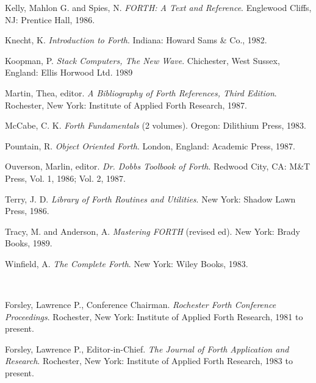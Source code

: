 \begin{description}
\begin{description}
	\item Kelly, Mahlon G. and Spies, N.
		\emph{FORTH: A Text and Reference}.
		Englewood Cliffs, NJ: Prentice Hall, 1986.

	\item Knecht, K.
		\emph{Introduction to Forth}.
		Indiana: Howard Sams \& Co., 1982.

	\item Koopman, P.
		\emph{Stack Computers, The New Wave}.
		Chichester, West Sussex, England: Ellis Horwood Ltd. 1989

	\item Martin, Thea, editor.
		\emph{A Bibliography of Forth References, Third Edition}.
		Rochester, New York: Institute of Applied Forth Research, 1987.

	\item McCabe, C. K.
		\emph{Forth Fundamentals} (2 volumes).
		Oregon: Dilithium Press, 1983.

	\item Pountain, R.
		\emph{Object Oriented Forth}.
		London, England: Academic Press, 1987.

	\item Ouverson, Marlin, editor.
		\emph{Dr. Dobbs Toolbook of Forth}.
		Redwood City, CA: M\&T Press, Vol. 1, 1986; Vol. 2, 1987.

	\item Terry, J. D.
		\emph{Library of Forth Routines and Utilities}.
		New York: Shadow Lawn Press, 1986.

	\item Tracy, M. and Anderson, A.
		\emph{Mastering FORTH} (revised ed).
		New York: Brady Books, 1989.

	\item Winfield, A.
		\emph{The Complete Forth}.
		New York: Wiley Books, 1983.
	\end{description}


\item[Journals, magazines and newsletters]~

	\begin{description}
	\item Forsley, Lawrence P., Conference Chairman.
		\emph{Rochester Forth Conference Proceedings}.
		Rochester, New York: Institute of Applied Forth Research, 1981 to present.

	\item Forsley, Lawrence P., Editor-in-Chief.
		\emph{The Journal of Forth Application and Research}.
		Rochester, New York: Institute of Applied Forth Research, 1983 to present.


\end{description}
\end{description}
